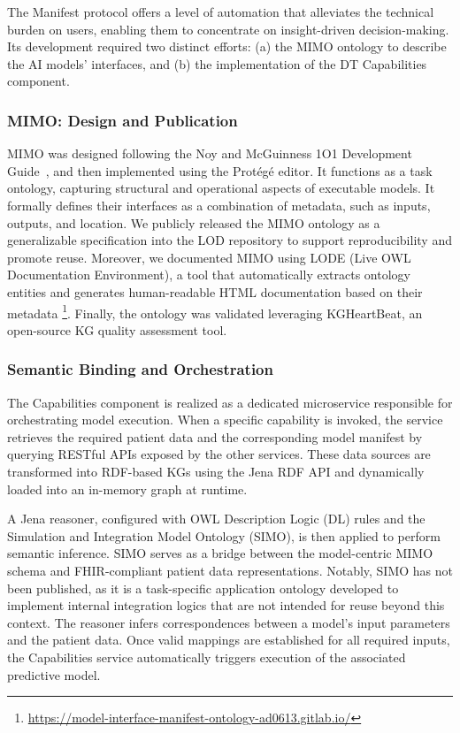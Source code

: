 The Manifest protocol offers a level of automation that alleviates the technical burden on users, enabling them to concentrate on insight-driven decision-making. Its development required two distinct efforts: (a) the MIMO ontology to describe the AI models' interfaces, and (b) the implementation of the DT Capabilities component. 
\subsubsection{MIMO: Design and Publication}
MIMO was designed following the Noy and McGuinness 1O1 Development Guide~\cite{mcguninnes}, and then implemented using the Protégé editor. It functions as a task ontology, capturing structural and operational aspects of executable models. It formally defines their interfaces as a combination of metadata, such as inputs, outputs, and location. We publicly released the MIMO ontology as a generalizable specification into the LOD repository to support reproducibility and promote reuse. Moreover, we documented MIMO using LODE (Live OWL Documentation Environment), a tool that automatically extracts ontology entities and generates human-readable HTML documentation based on their metadata \footnote{\url{https://model-interface-manifest-ontology-ad0613.gitlab.io/}}. Finally, the ontology was validated leveraging KGHeartBeat, an open-source KG quality assessment tool.
\subsubsection{Semantic Binding and Orchestration}
The Capabilities component is realized as a dedicated microservice responsible for orchestrating model execution. When a specific capability is invoked, the service retrieves the required patient data and the corresponding model manifest by querying RESTful APIs exposed by the other services. These data sources are transformed into RDF-based KGs using the Jena RDF API and dynamically loaded into an in-memory graph at runtime.

A Jena reasoner, configured with OWL Description Logic (DL) rules and the Simulation and Integration Model Ontology (SIMO), is then applied to perform semantic inference. SIMO serves as a bridge between the model-centric MIMO schema and FHIR-compliant patient data representations. Notably, SIMO has not been published, as it is a task-specific application ontology developed to implement internal integration logics that are not intended for reuse beyond this context. The reasoner infers correspondences between a model’s input parameters and the patient data. Once valid mappings are established for all required inputs, the Capabilities service automatically triggers execution of the associated predictive model.

